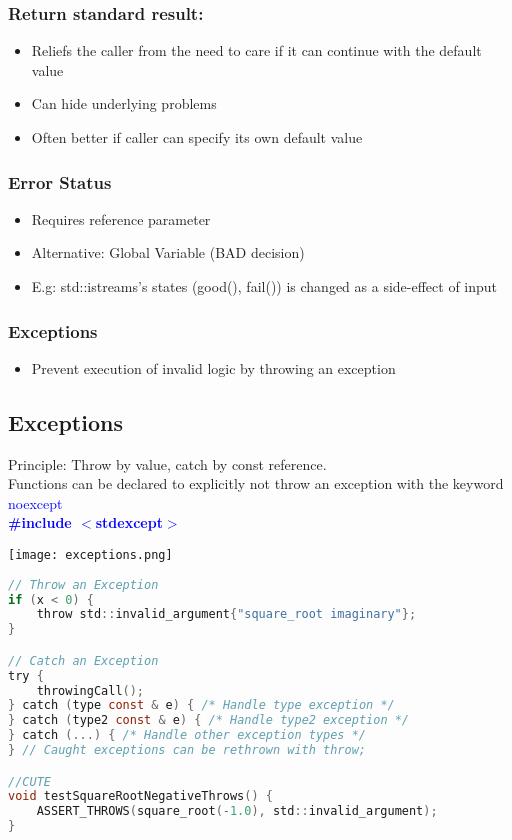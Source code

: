 \begin{minipage}{0.5\linewidth}
    \subsubsection{Return standard result:}
    \begin{itemize}
        \item Reliefs the caller from the need to care if it can continue with the default value
        \item Can hide underlying problems
        \item Often better if caller can specify its own default value
    \end{itemize}
    \subsubsection{Error Status}
    \begin{itemize}
        \item Requires reference parameter
        \item Alternative: Global Variable (BAD decision)
        \item E.g: std::istreams's states (good(), fail()) is changed as a side-effect of input
    \end{itemize}
    \subsubsection{Exceptions}
    \begin{itemize}
        \item Prevent execution of invalid logic by throwing an exception
    \end{itemize}
\end{minipage}

\subsection{Exceptions}
Principle: Throw by value, catch by const reference.\\
Functions can be declared to explicitly not throw an exception with the keyword \textcolor{blue}{noexcept}\\
\textcolor{blue}{\textbf{\#include $<$stdexcept$>$}}
\begin{center}
    \texttt{[image: exceptions.png]}
\end{center}
\begin{lstlisting}[style=frame, style= linenumbers, language=C]
// Throw an Exception
if (x < 0) {
    throw std::invalid_argument{"square_root imaginary"};
}

// Catch an Exception
try {
    throwingCall();
} catch (type const & e) { /* Handle type exception */
} catch (type2 const & e) { /* Handle type2 exception */
} catch (...) { /* Handle other exception types */
} // Caught exceptions can be rethrown with throw;

//CUTE
void testSquareRootNegativeThrows() {
    ASSERT_THROWS(square_root(-1.0), std::invalid_argument);
}
\end{lstlisting}



